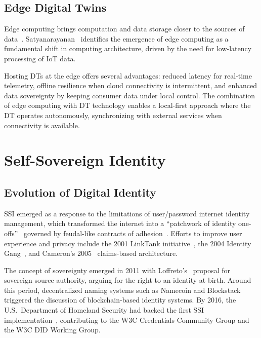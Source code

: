 \subsection{Edge Digital Twins}
\label{subsec:edge-dt}

Edge computing brings computation and data storage closer to the sources of data~\cite{shi:cao:zhang:li:xu:2016}.
Satyanarayanan~\cite{satyanarayanan:2017} identifies the emergence of edge computing as a fundamental shift in computing architecture, driven by the need for low-latency processing of \ac{IoT} data.

Hosting \acp{DT} at the edge offers several advantages: reduced latency for real-time telemetry, offline resilience when cloud connectivity is intermittent, and enhanced data sovereignty by keeping consumer data under local control.
The combination of edge computing with \ac{DT} technology enables a local-first approach where the \ac{DT} operates autonomously, synchronizing with external services when connectivity is available.

\section{Self-Sovereign Identity}
\label{sec:ssi}

\subsection{Evolution of Digital Identity}
\label{subsec:ssi-evolution}

\noindent \ac{SSI} emerged as a response to the limitations of user/password internet identity management, which transformed the internet into a ``patchwork of identity one-offs''~\cite{cameron:2005} governed by feudal-like contracts of adhesion~\cite{searls:2012}.
Efforts to improve user experience and privacy include the 2001 LinkTank initiative~\cite{planetwork:2003}, the 2004 Identity Gang~\cite{vescent:young:duffy:etal:2018}, and Cameron's 2005~\cite{cameron:2005} claims-based architecture.

The concept of sovereignty emerged in 2011 with Loffreto's~\cite{loffreto:2012} proposal for sovereign source authority, arguing for the right to an identity at birth.
Around this period, decentralized naming systems such as Namecoin and Blockstack~\cite{zhu:badr:2018,dunphy:petitcolas:2018} triggered the discussion of blockchain-based identity systems.
By 2016, the U.S.\ Department of Homeland Security had backed the first \ac{SSI} implementation~\cite{reed:law:hardman:2016,preukschat:reed:2021}, contributing to the \ac{W3C} Credentials Community Group and the \ac{W3C} DID Working Group.


